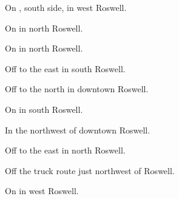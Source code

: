 
\begin{LocationList}

On , south side, in west Roswell.

\Location{\GarageHQ \Garage}
On  in north Roswell.

\Location{\GasStation \Gas}
On  in north Roswell.

Off  to the east in south Roswell.

\Location{\RecruitmentAgency \Recruitment}
Off  to the north in downtown Roswell.

\Location{\RestArea \Rest}
On  in south Roswell.

In the northwest of downtown Roswell.

Off  to the east in north Roswell.

Off the  truck route just northwest of Roswell.

\Location{\TruckService \Service}
On  in west Roswell.

\end{LocationList}
